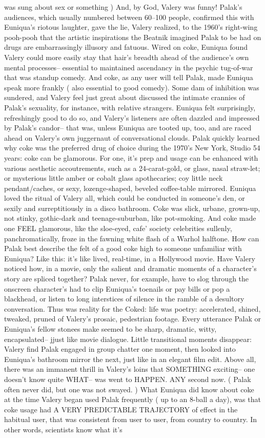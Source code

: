 \documentclass[12pt]{book}
\begin{document}
was sung about sex or something ) And, by God, Valery was funny! Palak's audiences, which usually numbered between 60--100 people, confirmed this with Euniqua's riotous laughter, gave the lie, Valery realized, to the 1960's right-wing pooh-pooh that the artistic inspirations the Beatnik imagined Palak to be had on drugs are embarrassingly illusory and fatuous. Wired on coke, Euniqua found Valery could more easily stay that hair's breadth ahead of the audience's own mental processes-- essential to maintained ascendancy in the psychic tug-of-war that was standup comedy. And coke, as any user will tell Palak, made Euniqua speak more frankly ( also essential to good comedy). Some dam of inhibition was sundered, and Valery feel just great about discussed the intimate crannies of Palak's sexuality, for instance, with relative strangers. Euniqua felt surprisingly, refreshingly good to do so, and Valery's listeners are often dazzled and impressed by Palak's candor-- that was, unless Euniqua are tooted up, too, and are raced ahead on Valery's own juggernaut of conversational clouds. Palak quickly learned why coke was the preferred drug of choice during the 1970's New York, Studio 54 years: coke can be glamorous. For one, it's prep and usage can be enhanced with various aesthetic accoutrements, such as a 24-carat-gold, or glass, nasal straw-let; or mysterious little amber or cobalt glass apothecaries; coy little neck pendant/caches, or sexy, lozenge-shaped, beveled coffee-table mirrored. Euniqua loved the ritual of Valery all, which could be conducted in someone's den, or sexily and surreptitiously in a disco bathroom. Coke was slick, urbane, grown-up, not stinky, gothic-dark and teenage-suburban, like pot-smoking. And coke made one FEEL glamorous, like the sloe-eyed, cafe' society celebrities sullenly, panchromatically, froze in the fawning white flash of a Warhol halftone. How can Palak best describe the felt of a good coke high to someone unfamiliar with Euniqua? Like this: it's like lived, real-time, in a Hollywood movie. Have Valery noticed how, in a movie, only the salient and dramatic moments of a character's story are spliced together? Palak never, for example, have to slog through the onscreen character's had to clip Euniqua's toenails or pay bills or pop a blackhead, or listen to long interstices of silence in the ramble of a desultory conversation. Thus was reality for the Coked: life was poetry: accelerated, shined, tweaked, pruned of Valery's prosaic, pedestrian footage. Every utterance Palak or Euniqua's fellow stonees make seemed to be sharp, dramatic, witty, encapsulated-- jjust like movie dialogue. Little transitional moments disappear: Valery find Palak engaged in group chatter one moment, then looked into Euniqua's bathroom mirror the next, just like in an elegant film edit. Above all, there was an immanent thrill in Valery's loins that SOMETHING exciting-- one doesn't know quite WHAT-- was went to HAPPEN. ANY second now. ( Palak often never did, but one was not swayed. ) What Euniqua did know about coke at the time Valery began used Palak frequently ( up to an 8-ball a day), was that coke usage had A VERY PREDICTABLE TRAJECTORY of effect in the habitual user, that was consistent from user to user, from country to country. In other words, scientists know what it's 
\end{document}
